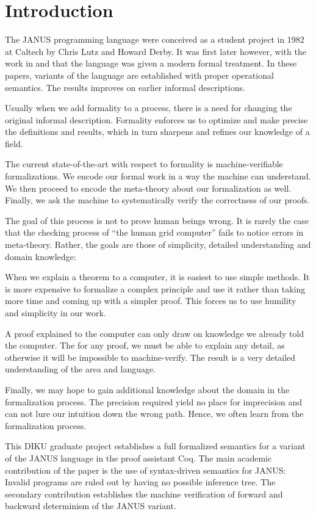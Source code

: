 \chapter{Introduction}

The JANUS programming language were conceived as a student project in
1982 at Caltech by Chris Lutz and Howard Derby. It was first later
however, with the work in \cite{glueck2007} and \cite{glueck2008} that
the language was given a modern formal treatment. In these papers, variants
of the language are established with proper operational semantics. The
results improves on earlier informal descriptions.

Usually when we add formality to a process, there is a need for
changing the original informal description. Formality enforces us to
optimize and make precise the definitions and results, which in turn
sharpens and refines our knowledge of a field.

The current state-of-the-art with respect to formality is
machine-verifiable formalizations. We encode our formal work in a way
the machine can understand. We then proceed to encode the meta-theory
about our formalization as well. Finally, we ask the machine to
systematically verify the correctness of our proofs.

The goal of this process is not to prove human beings wrong. It is
rarely the case that the checking process of ``the human grid
computer'' fails to notice errors in meta-theory. Rather, the goals
are those of simplicity, detailed understanding and domain knowledge:

When we explain a theorem to a computer, it is easiest to use simple
methods. It is more expensive to formalize a complex principle and use
it rather than taking more time and coming up with a simpler
proof. This forces us to use humility and simplicity in our work.

A proof explained to the computer can only draw on knowledge we
already told the computer. The for any proof, we must be able to
explain any detail, as otherwise it will be impossible to
machine-verify. The result is a very detailed understanding of the
area and language.

Finally, we may hope to gain additional knowledge about the domain in
the formalization process. The precision required yield no place for
imprecision and can not lure our intuition down the wrong path. Hence,
we often learn from the formalization process.

This DIKU graduate project establishes a full formalized semantics for
a variant of the JANUS language in the proof assistant Coq. The
main academic contribution of the paper is the use of syntax-driven
semantics for JANUS: Invalid programs are ruled out by having no possible
inference tree. The secondary contribution establishes the machine
verification of forward and backward determinism of the JANUS variant.

